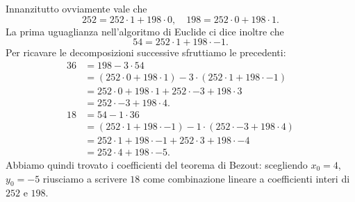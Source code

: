 \begin{example}
    Innanzitutto ovviamente vale che \[
        252 = 252 \cdot \boxed{1} + 198 \cdot \boxed{0}, \quad
        198 = 252 \cdot \boxed{0} + 198 \cdot \boxed{1}.
    \] La prima uguaglianza nell'algoritmo di Euclide ci dice inoltre che \[
        54 = 252 \cdot \boxed{1} + 198 \cdot \boxed{-1}.
    \] Per ricavare le decomposizioni successive sfruttiamo le precedenti: \begin{align*}
        36  &= 198 - \boxed{3} \cdot 54\\
            &= (252 \cdot \boxed{0} + 198 \cdot \boxed{1}) - \boxed{3} \cdot (252 \cdot \boxed{1} + 198 \cdot \boxed{-1}) \\
            &= 252 \cdot \boxed{0} + 198 \cdot \boxed{1} + 252 \cdot \boxed{-3} + 198 \cdot \boxed{3}\\
            &= 252 \cdot \boxed{-3} + 198 \cdot \boxed{4}.\\
        18  &= 54 - \boxed{1} \cdot 36\\
            &= (252 \cdot \boxed{1} + 198 \cdot \boxed{-1}) - \boxed{1} \cdot (252 \cdot \boxed{-3} + 198 \cdot \boxed{4}) \\
            &= 252 \cdot \boxed{1} + 198 \cdot \boxed{-1} + 252 \cdot \boxed{3} + 198 \cdot \boxed{-4}\\
            &= 252 \cdot \boxed{4} + 198 \cdot \boxed{-5}.
    \end{align*}
    Abbiamo quindi trovato i coefficienti del teorema di Bezout: scegliendo $x_0 = 4$, $y_0 = -5$ riusciamo a scrivere $18$ come combinazione lineare a coefficienti interi di $252$ e $198$.


\end{example}
